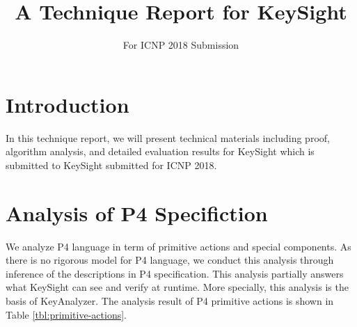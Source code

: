\documentclass[sigconf, 10pt]{acmart}
\theoremstyle{plain}
\begin{document}
\title{A Technique Report for KeySight}

\subtitle{For ICNP 2018 Submission}


\renewcommand{\shortauthors}{Anonymous Authors}
\newcommand{\start}[1]{\vspace{5pt}\noindent\textbf{#1}}
\newcommand{\ie}{\emph{i.e.,}}
\newcommand{\eg}{\emph{e.g.,}}
\newcommand{\etal}{\emph{et al.}\xspace}

\maketitle


\section{Introduction}

In this technique report, we will present technical materials including proof, algorithm analysis, and detailed evaluation results for KeySight which is submitted to KeySight submitted for ICNP 2018.




\section{Analysis of P4 Specifiction}
We analyze P4 \cite{p4} language in term of primitive actions and special components. As there is no rigorous model for P4 language, we conduct this analysis through inference of the descriptions in P4 specification. This analysis partially answers what KeySight can see and verify at runtime. More specially, this analysis is the basis of KeyAnalyzer. The analysis result of P4 primitive actions is shown in Table \ref{tbl:primitive-actions}.
\end{document}
